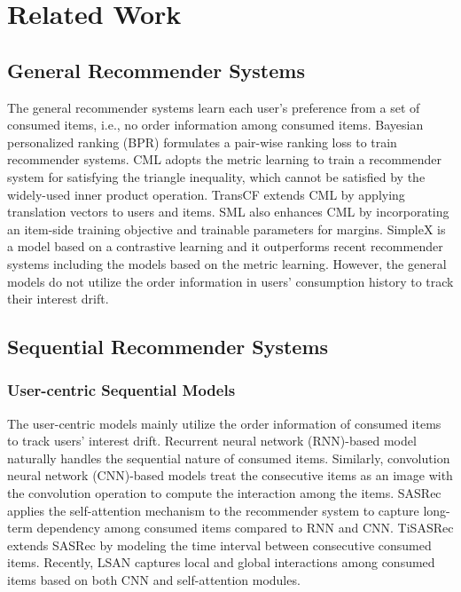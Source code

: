 \documentclass[sigconf]{acmart}
\begin{document}
\section{Related Work}

\subsection{\textbf{General Recommender Systems}}
The general recommender systems learn each user's preference from a set of consumed items, i.e., no order information among consumed items. 
Bayesian personalized ranking (BPR) \cite{rendle2012bpr} formulates a pair-wise ranking loss to train recommender systems.
CML \cite{hsieh2017collaborative} adopts the metric learning to train a recommender system for satisfying the triangle inequality, which cannot be satisfied by the widely-used inner product operation.
TransCF \cite{park2018collaborative} extends CML by applying translation vectors to users and items. 
SML \cite{li2020symmetric} also enhances CML by incorporating an item-side training objective and trainable parameters for margins.
SimpleX \cite{mao2021simplex} is a model based on a contrastive learning and it outperforms recent recommender systems including the models based on the metric learning.
However, the general models do not utilize the order information in users' consumption history to track their interest drift.

\subsection{Sequential Recommender Systems} 
\subsubsection{\textbf{User-centric Sequential Models}}
The user-centric models mainly utilize the order information of consumed items to track users' interest drift.
Recurrent neural network (RNN)-based model \cite{beutel2018latent} naturally handles the sequential nature of consumed items.
Similarly, convolution neural network (CNN)-based models \cite{tang2018personalized,ma2019hierarchical} treat the consecutive items as an image with the convolution operation to compute the interaction among the items. SASRec \cite{kang2018self} applies the self-attention mechanism \cite{vaswani2017attention} to the recommender system to capture long-term dependency among consumed items compared to RNN and CNN. TiSASRec \cite{li2020time} extends SASRec \cite{kang2018self} by modeling the time interval between consecutive consumed items. 
Recently, LSAN \cite{li2021lightweight} captures local and global interactions among consumed items based on both CNN and self-attention modules.
\end{document}

